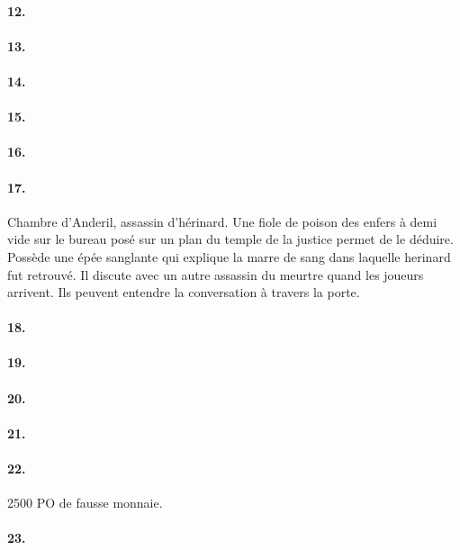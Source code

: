 \paragraph{12. }
\paragraph{13. }
\paragraph{14. }
\paragraph{15. }
\paragraph{16. }
\paragraph{17. }
Chambre d'Anderil, assassin d'hérinard. Une fiole de poison des enfers 
à demi vide sur le 
bureau posé sur un plan du temple de la justice permet de le déduire.
Possède une épée sanglante qui explique la marre de sang dans laquelle 
herinard fut retrouvé. Il discute avec un autre assassin du meurtre quand 
les joueurs arrivent. Ils peuvent entendre la conversation à travers la porte.


\paragraph{18. }
\paragraph{19. }
\paragraph{20. }
\paragraph{21. }


\paragraph{22. }
2500 PO de fausse monnaie.

\paragraph{23. }
